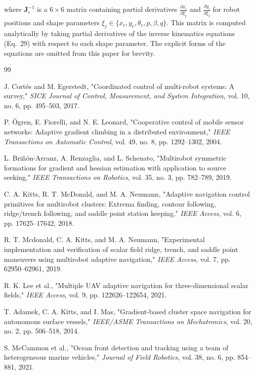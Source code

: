 \documentclass[lettersize,journal]{IEEEtran}
\begin{document}
where $\mathbf{J}_c^{-1}$ is a $6 \times 6$ matrix containing partial derivatives $\frac{\partial x_i}{\partial \xi_j}$ and $\frac{\partial y_i}{\partial \xi_j}$ for robot positions and shape parameters $\xi_j \in \{x_c, y_c, \theta_c, p, \beta, q\}$. This matrix is computed analytically by taking partial derivatives of the inverse kinematics equations (Eq.~29) with respect to each shape parameter. The explicit forms of the equations are omitted from this paper for brevity.


\balance
\begin{thebibliography}{99}

 J. Cortés and M. Egerstedt, "Coordinated control of multi-robot systems: A survey," \textit{SICE Journal of Control, Measurement, and System Integration}, vol. 10, no. 6, pp. 495--503, 2017.

 P. Ögren, E. Fiorelli, and N. E. Leonard, "Cooperative control of mobile sensor networks: Adaptive gradient climbing in a distributed environment," \textit{IEEE Transactions on Automatic Control}, vol. 49, no. 8, pp. 1292--1302, 2004.

 L. Briñón-Arranz, A. Renzaglia, and L. Schenato, "Multirobot symmetric formations for gradient and hessian estimation with application to source seeking," \textit{IEEE Transactions on Robotics}, vol. 35, no. 3, pp. 782--789, 2019.

 C. A. Kitts, R. T. McDonald, and M. A. Neumann, "Adaptive navigation control primitives for multirobot clusters: Extrema finding, contour following, ridge/trench following, and saddle point station keeping," \textit{IEEE Access}, vol. 6, pp. 17625--17642, 2018.

 R. T. Mcdonald, C. A. Kitts, and M. A. Neumann, "Experimental implementation and verification of scalar field ridge, trench, and saddle point maneuvers using multirobot adaptive navigation," \textit{IEEE Access}, vol. 7, pp. 62950--62961, 2019.

 R. K. Lee et al., "Multiple UAV adaptive navigation for three-dimensional scalar fields," \textit{IEEE Access}, vol. 9, pp. 122626--122654, 2021.

 T. Adamek, C. A. Kitts, and I. Mas, "Gradient-based cluster space navigation for autonomous surface vessels," \textit{IEEE/ASME Transactions on Mechatronics}, vol. 20, no. 2, pp. 506--518, 2014.

 S. McCammon et al., "Ocean front detection and tracking using a team of heterogeneous marine vehicles," \textit{Journal of Field Robotics}, vol. 38, no. 6, pp. 854--881, 2021.


\end{thebibliography}
\end{document}

